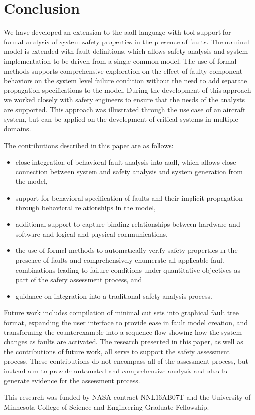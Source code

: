 \section{Conclusion}
\label{sec:conclusion}
We have developed an extension to the \gls{aadl} language with tool support for formal analysis of system safety properties in the presence of faults. The nominal model is extended with fault definitions, which allows safety analysis and system implementation to be driven from a single common model. The use of formal methods supports comprehensive exploration on the effect of faulty component behaviors on the system level failure condition without the need to add separate propagation specifications to the model. During the development of this approach we worked closely with safety engineers to ensure that the needs of the analysts are supported. This approach was illustrated through the use case of an aircraft system, but can be applied on the development of critical systems in multiple domains. 

The contributions described in this paper are as follows:

\begin{itemize}
\renewcommand{\labelitemi}{\textbullet}
		\item close integration of behavioral fault analysis into \gls{aadl}, which allows close connection between system and safety analysis and system generation from the model,
		\item support for behavioral specification of faults and their  implicit propagation through behavioral relationships in the model,
		\item additional support to capture binding relationships between hardware and software and logical and physical communications, %
		\item the use of formal methods to automatically verify safety properties in the presence of faults and comprehensively enumerate all applicable fault combinations leading to failure conditions under quantitative objectives as part of the safety assessment process, and
		\item guidance on integration into a traditional safety analysis process.
\end{itemize}

Future work includes compilation of minimal cut sets into graphical fault tree format, expanding the user interface to provide ease in fault model creation, and transforming the counterexample into a sequence flow showing how the system changes as faults are activated. The research presented in this paper, as well as the contributions of future work, all serve to support the safety assessment process. These contributions do not encompass all of the assessment process, but instead aim to provide automated and comprehensive analysis and also to generate evidence for the assessment process.



\vspace{2 mm}
 This research was funded by NASA contract NNL16AB07T and the University of Minnesota College of Science and Engineering Graduate Fellowship.

